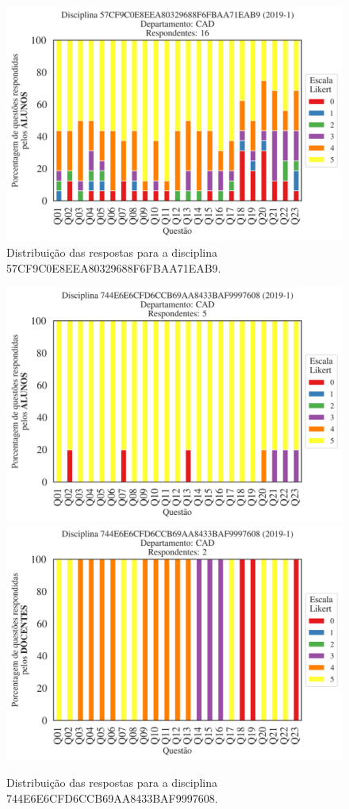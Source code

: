\documentclass[a4paper,10pt]{article}
\begin{document}
\begin{figure}[h]
\centering
\includegraphics[width=0.485\linewidth]{analise_disciplina_departamento_CAD_ALUNO_TURMA_57CF9C0E8EEA80329688F6FBAA71EAB9.png}
\caption{\label{fig:analise_geral_departamento}                Distribuição das respostas para a disciplina 57CF9C0E8EEA80329688F6FBAA71EAB9.}
\end{figure}
\begin{figure}[h]
\centering
\includegraphics[width=0.485\linewidth]{analise_disciplina_departamento_CAD_ALUNO_TURMA_744E6E6CFD6CCB69AA8433BAF9997608.png}
\includegraphics[width=0.485\linewidth]{analise_disciplina_departamento_CAD_DOCENTE_TURMA_744E6E6CFD6CCB69AA8433BAF9997608.png}
\caption{\label{fig:analise_geral_departamento}                Distribuição das respostas para a disciplina 744E6E6CFD6CCB69AA8433BAF9997608.}
\end{figure}
\end{document}
